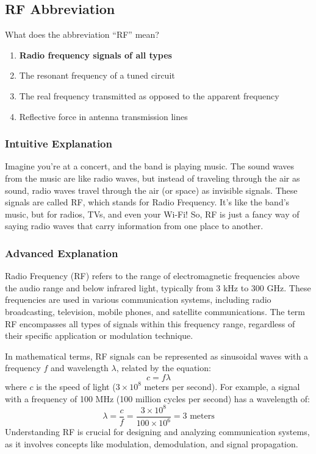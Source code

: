 \subsection{RF Abbreviation}
\label{T5C06}

\begin{tcolorbox}[colback=gray!10!white,colframe=black!75!black,title=T5C06]
What does the abbreviation “RF” mean?
\begin{enumerate}[label=\Alph*)]
    \item \textbf{Radio frequency signals of all types}
    \item The resonant frequency of a tuned circuit
    \item The real frequency transmitted as opposed to the apparent frequency
    \item Reflective force in antenna transmission lines
\end{enumerate}
\end{tcolorbox}

\subsubsection{Intuitive Explanation}
Imagine you’re at a concert, and the band is playing music. The sound waves from the music are like radio waves, but instead of traveling through the air as sound, radio waves travel through the air (or space) as invisible signals. These signals are called RF, which stands for Radio Frequency. It’s like the band’s music, but for radios, TVs, and even your Wi-Fi! So, RF is just a fancy way of saying radio waves that carry information from one place to another.

\subsubsection{Advanced Explanation}
Radio Frequency (RF) refers to the range of electromagnetic frequencies above the audio range and below infrared light, typically from 3 kHz to 300 GHz. These frequencies are used in various communication systems, including radio broadcasting, television, mobile phones, and satellite communications. The term RF encompasses all types of signals within this frequency range, regardless of their specific application or modulation technique.

In mathematical terms, RF signals can be represented as sinusoidal waves with a frequency \( f \) and wavelength \( \lambda \), related by the equation:
\[
c = f \lambda
\]
where \( c \) is the speed of light (\( 3 \times 10^8 \) meters per second). For example, a signal with a frequency of 100 MHz (100 million cycles per second) has a wavelength of:
\[
\lambda = \frac{c}{f} = \frac{3 \times 10^8}{100 \times 10^6} = 3 \text{ meters}
\]
Understanding RF is crucial for designing and analyzing communication systems, as it involves concepts like modulation, demodulation, and signal propagation.

